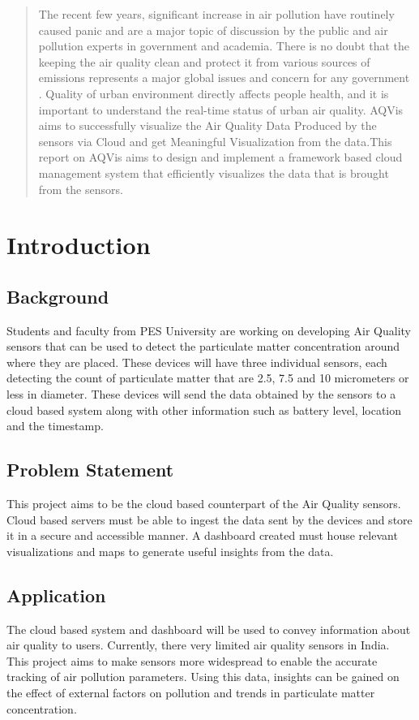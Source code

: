 \documentclass[]{report}
\begin{document}
 

\begin{abstract}
 The recent few years, significant increase in air pollution have routinely caused panic and are a major topic of discussion by the public and air pollution experts in government and academia. There is no doubt that the keeping the air quality clean and protect it from various sources of emissions represents a major global issues and concern for any government . Quality of urban environment directly affects people health, and it is important to understand the real-time status of urban air quality. AQVis aims to successfully visualize the Air Quality Data Produced by the sensors via Cloud and get Meaningful Visualization from the data.This report on AQVis aims to design and implement a framework based cloud management system that efficiently visualizes the data that is brought from the sensors.
\end{abstract}

\tableofcontents

\chapter{Introduction}
\section{Background}
Students and faculty from PES University are working on developing Air Quality sensors that can be used to detect the particulate matter concentration around where they are placed. These devices will have three individual sensors, each detecting the count of particulate matter that are 2.5, 7.5 and 10 micrometers or less in diameter. These devices will send the data obtained by the sensors to a cloud based system along with other information such as battery level, location and the timestamp.
\section{Problem Statement}
This project aims to be the cloud based counterpart of the Air Quality sensors. Cloud based servers must be able to ingest the data sent by the devices and store it in a secure and accessible manner. A dashboard created must house relevant visualizations and maps to generate useful insights from the data.
\section{Application}
The cloud based system and dashboard will be used to convey information about air quality to users. Currently, there very limited air quality sensors in India. This project aims to make sensors more widespread to enable the accurate tracking of air pollution parameters. Using this data, insights can be gained on the effect of external factors on pollution and trends in particulate matter concentration.
\end{document}
